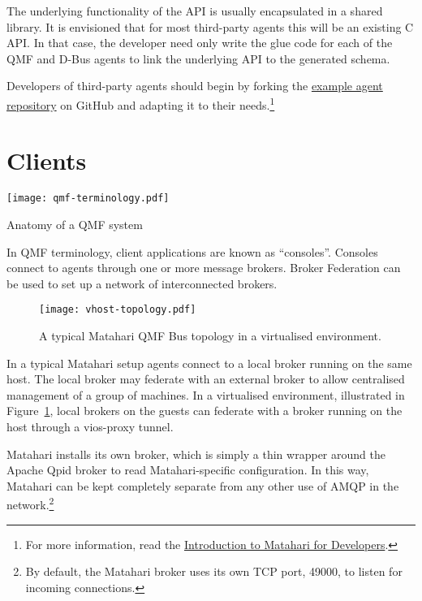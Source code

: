 \documentclass{tufte-handout}
\begin{document}
The underlying functionality of the API is usually encapsulated in a shared library. It is envisioned that for most third-party agents this will be an existing C API. In that case, the developer need only write the glue code for each of the QMF and D-Bus agents to link the underlying API to the generated schema.

Developers of third-party agents should begin by forking the \href{https://github.com/matahari/matahari-agent-example}{example agent repository} on GitHub and adapting it to their needs.\footnote{For more information, read the \href{https://github.com/downloads/zaneb/presentations/matahari-for-developers-7db27de.pdf}{Introduction to Matahari for Developers}.}

\section{Clients}

\begin{marginfigure}
\texttt{[image: qmf-terminology.pdf]}
\caption{Anatomy of a QMF system}
\label{fig:qmf-terminology}
\end{marginfigure}

In QMF terminology, client applications are known as ``consoles''. Consoles connect to agents through one or more message brokers. Broker Federation can be used to set up a network of interconnected brokers.

\begin{figure}[b]
\texttt{[image: vhost-topology.pdf]}
\caption{A typical Matahari QMF Bus topology in a virtualised environment.}
\label{fig:vhost-topology}
\end{figure}

In a typical Matahari setup agents connect to a local broker running on the same host. The local broker may federate with an external broker to allow centralised management of a group of machines.
In a virtualised environment, illustrated in Figure~\ref{fig:vhost-topology}, local brokers on the guests can federate with a broker running on the host through a  vios-proxy tunnel.
 
Matahari installs its own broker, which is simply a thin wrapper around the Apache Qpid broker to read Matahari-specific configuration. In this way, Matahari can be kept completely separate from any other use of AMQP in the network.\footnote{By default, the Matahari broker uses its own TCP port, 49000, to listen for incoming connections.}
\end{document}
